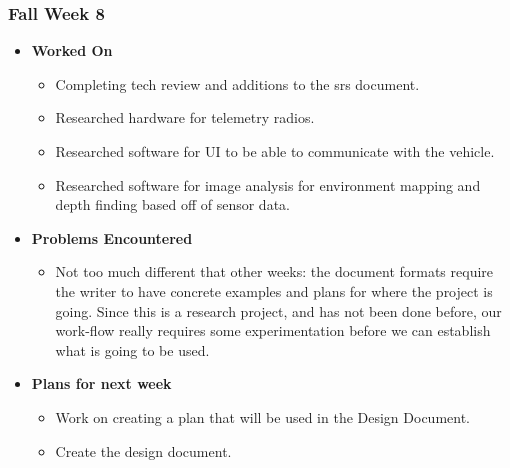 \documentclass[compsoc,draftclsnofoot,onecolumn,10pt]{IEEEtran}
\begin{document}
\subsubsection{Fall Week 8}
\begin{itemize}
    \item {\textbf{Worked On}}
    \begin{itemize}
        \item Completing tech review and additions to the srs document.
        \item Researched hardware for telemetry radios.
        \item Researched software for UI to be able to communicate with the vehicle.
        \item Researched software for image analysis for environment mapping and depth finding based off of sensor data.
    \end{itemize}

    \item {\textbf{Problems Encountered}}
    \begin{itemize}
        \item Not too much different that other weeks: the document formats require the writer to have concrete examples and plans for where the project is going. Since this is a research project, and has not been done before, our work-flow really requires some experimentation before we can establish what is going to be used.
    \end{itemize}

    \item{\textbf{Plans for next week}}
    \begin{itemize}
        \item Work on creating a plan that will be used in the Design Document.
        \item Create the design document.
    \end{itemize}
\end{itemize}
\end{document}
